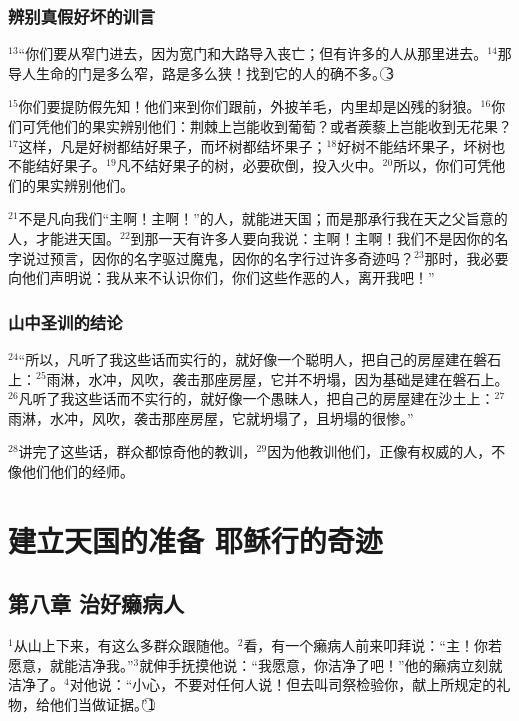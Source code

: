 \subsubsection{辨别真假好坏的训言}
$^{13}$“你们要从窄门进去，因为宽门和大路导入丧亡；但有许多的人从那里进去。$^{14}$那导人生命的门是多么窄，路是多么狭！找到它的人的确不多。\textcircled{3}

$^{15}$你们要提防假先知！他们来到你们跟前，外披羊毛，内里却是凶残的豺狼。$^{16}$你们可凭他们的果实辨别他们：荆棘上岂能收到葡萄？或者蒺藜上岂能收到无花果？$^{17}$这样，凡是好树都结好果子，而坏树都结坏果子；$^{18}$好树不能结坏果子，坏树也不能结好果子。$^{19}$凡不结好果子的树，必要砍倒，投入火中。$^{20}$所以，你们可凭他们的果实辨别他们。

$^{21}$不是凡向我们“主啊！主啊！”的人，就能进天国；而是那承行我在天之父旨意的人，才能进天国。$^{22}$到那一天有许多人要向我说：主啊！主啊！我们不是因你的名字说过预言，因你的名字驱过魔鬼，因你的名字行过许多奇迹吗？$^{23}$那时，我必要向他们声明说：我从来不认识你们，你们这些作恶的人，离开我吧！”


\subsubsection{山中圣训的结论}
$^{24}$“所以，凡听了我这些话而实行的，就好像一个聪明人，把自己的房屋建在磐石上：$^{25}$雨淋，水冲，风吹，袭击那座房屋，它并不坍塌，因为基础是建在磐石上。$^{26}$凡听了我这些话而不实行的，就好像一个愚昧人，把自己的房屋建在沙土上：$^{27}$雨淋，水冲，风吹，袭击那座房屋，它就坍塌了，且坍塌的很惨。”

$^{28}$\UL[耶稣]讲完了这些话，群众都惊奇他的教训，$^{29}$因为他教训他们，正像有权威的人，不像他们他们的经师。


\section{建立天国的准备 耶稣行的奇迹}


\subsection{第八章 治好癞病人}
$^{1}$\UL[耶稣]从山上下来，有这么多群众跟随他。$^{2}$看，有一个癞病人前来叩拜\UL[耶稣]说：“主！你若愿意，就能洁净我。”$^{3}$\UL[耶稣]就伸手抚摸他说：“我愿意，你洁净了吧！”他的癞病立刻就洁净了。$^{4}$\UL[耶稣]对他说：“小心，不要对任何人说！但去叫司祭检验你，献上\UL[梅瑟]所规定的礼物，给他们当做证据。”\textcircled{1}


